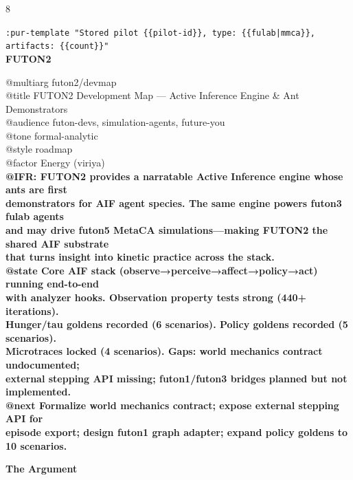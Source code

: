 \documentclass[landscape]{article}
\newenvironment{devmapgreenfield}{%
  \def\FrameCommand{\colorbox{devmapgreenfieldbg}}%
  \setlength{\fboxsep}{2pt}%
  \MakeFramed{\advance\hsize-\width \FrameRestore}%
}{\endMakeFramed}
\begin{document}
\begin{paracol}{8}
\begin{devmapgreenfield}
  \texttt{:\allowbreak{}pur-\allowbreak{}template "Stored pilot \{\{pilot-\allowbreak{}id\}\},\allowbreak{} type:\allowbreak{} \{\{fulab|\allowbreak{}mmca\}\},\allowbreak{} artifacts:\allowbreak{} \{\{count\}\}"}\\
\end{devmapgreenfield}
\switchcolumn
\textbf{FUTON2}\par
\medskip
@multiarg futon2/devmap\\
@title FUTON2 Development Map — Active Inference Engine \& Ant Demonstrators\\
@audience futon-devs, simulation-agents, future-you\\
@tone formal-analytic\\
@style roadmap\\
@factor Energy (viriya)\\
\textbf{@IFR: FUTON2 provides a narratable Active Inference engine whose ants are first}\\
\textbf{demonstrators for AIF agent species. The same engine powers futon3 fulab agents}\\
\textbf{and may drive futon5 MetaCA simulations—making FUTON2 the shared AIF substrate}\\
\textbf{that turns insight into kinetic practice across the stack.}\\
\textbf{@state Core AIF stack (observe→perceive→affect→policy→act) running end-to-end}\\
\textbf{with analyzer hooks. Observation property tests strong (440+ iterations).}\\
\textbf{Hunger/tau goldens recorded (6 scenarios). Policy goldens recorded (5 scenarios).}\\
\textbf{Microtraces locked (4 scenarios). Gaps: world mechanics contract undocumented;}\\
\textbf{external stepping API missing; futon1/futon3 bridges planned but not implemented.}\\
\textbf{@next Formalize world mechanics contract; expose external stepping API for}\\
\textbf{episode export; design futon1 graph adapter; expand policy goldens to 10 scenarios.}\\
\par
\textbf{The Argument}\par
\par

\end{paracol}
\end{document}
